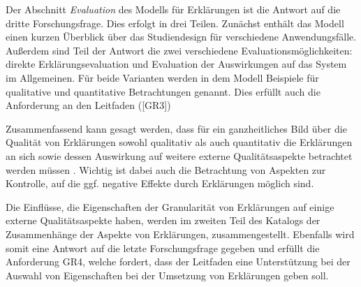 \smallskip

\noindent{}

\smallskip

Der Abschnitt \textit{Evaluation} des Modells für Erklärungen ist die Antwort auf die dritte Forschungsfrage. Dies erfolgt in drei Teilen. Zunächst enthält das Modell einen kurzen Überblick über das Studiendesign für verschiedene Anwendungsfälle. Außerdem sind Teil der Antwort die zwei verschiedene Evaluationsmöglichkeiten: direkte Erklärungsevaluation und Evaluation der Auswirkungen auf das System im Allgemeinen. Für beide Varianten werden in dem Modell Beispiele für qualitative und quantitative Betrachtungen genannt. Dies erfüllt auch die Anforderung an den Leitfaden ([GR3])

Zusammenfassend kann gesagt werden, dass für ein ganzheitliches Bild über die Qualität von Erklärungen sowohl qualitativ als auch quantitativ die Erklärungen an sich sowie dessen Auswirkung auf weitere externe Qualitätsaspekte betrachtet werden müssen \cite{balog_measuring_2020}. Wichtig ist dabei auch die Betrachtung von Aspekten zur Kontrolle, auf die ggf. negative Effekte durch Erklärungen möglich sind.

\smallskip

\noindent{}

\smallskip

Die Einflüsse, die Eigenschaften der Granularität von Erklärungen auf einige externe Qualitätsaspekte haben, werden im zweiten Teil des Katalogs der Zusammenhänge der Aspekte von Erklärungen, zusammengestellt. Ebenfalls wird somit eine Antwort auf die letzte Forschungsfrage gegeben und erfüllt die Anforderung GR4, welche fordert, dass der Leitfaden eine Unterstützung bei der Auswahl von Eigenschaften bei der Umsetzung von Erklärungen geben soll.




